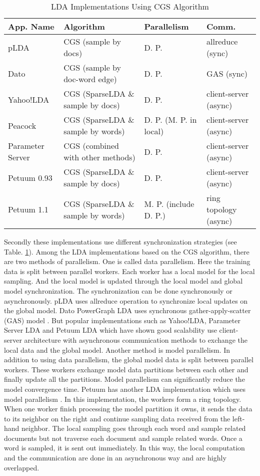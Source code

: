 \documentclass[conference]{IEEEtran}
\begin{document}
\begin {table}
\caption{LDA Implementations Using CGS Algorithm}
\label{tab:1}
\centering
\begin{tabular}{|m{1.5cm}|m{2.6cm}|m{1.6cm}|m{1.0cm}|}
	\hline
	App. Name&Algorithm&Parallelism&Comm.\\
	\hline
	pLDA&CGS (sample by docs)&D. P.&allreduce (sync)\\
	\hline
	Dato&CGS (sample by doc-word edge)&D. P.&GAS (sync)\\
	\hline
	Yahoo!LDA&
	CGS (SparseLDA \& sample by docs)
	&D. P.&client-server (async)\\
	\hline
	Peacock&CGS (SparseLDA \& sample by words)
	&D. P. (M. P. in local)&client-server (async)\\
	\hline
	Parameter Server 
	&CGS (combined with other methods)
	&D. P.&client-server (async)\\
	\hline
	Petuum 0.93
	&CGS (SparseLDA \& sample by docs)
	&D. P.&client-server (async)\\
	\hline
	Petuum 1.1
	&CGS (SparseLDA \& sample by words)
	&M. P. (include D. P.)&ring topology (async)\\\hline
\end{tabular}
\end{table}
Secondly these implementations use different synchronization strategies
(see Table. \ref{tab:1}). 
Among the LDA implementations based on the CGS algorithm,
there are two methods of parallelism.
One is called data parallelism. Here the training data is split
between parallel workers. Each worker has a local model for the local sampling.
And the local model is updated through the local model and global model 
synchronization. The synchronization can be done synchronously or asynchronously.
pLDA uses allreduce operation \cite{18}
to synchronize local updates on the global model.
Dato PowerGraph LDA uses synchronous gather-apply-scatter (GAS) model \cite{19}. 
But popular implementations such as
Yahoo!LDA, Parameter Server LDA and Petuum LDA \cite{20} 
which have shown good scalability use client-server architecture 
with asynchronous communication methods
to exchange the local data and the global model.
Another method is model parallelism. In addition to using data parallelism,
the global model data is split between parallel workers. 
These workers exchange model data partitions between each other
and finally update all the partitions.
Model parallelism can significantly reduce the model convergence time. 
Petuum has another LDA implementation which uses model parallelism \cite{21}.
In this implementation, the workers form a ring topology.
When one worker finish processing the model partition it owns,
it sends the data to its neighbor on the right
and continue sampling data received from the left-hand neighbor.
The local sampling goes through each word and sample related documents
but not traverse each document and sample related words.
Once a word is sampled, it is sent out immediately.
In this way, the local computation and the communication are done
in an asynchronous way and are highly overlapped.
\end{document}
